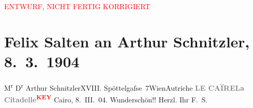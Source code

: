 
\begin{center}
            \textcolor{red}{ENTWURF, NICHT FERTIG KORRIGIERT}
                      \end{center}
            
         \renewcommand{\erwaehnteOrte}{Orte: Edmund-Weiß-Gasse, Kairo, Wien, XVIII., Währing, Österreich}
         \renewcommand{\erwaehnteWerke}{}
               \section[Felix Salten an Arthur Schnitzler, 8. 3. 1904]{ Felix Salten an Arthur Schnitzler, 8. 3. 1904}\nopagebreak{}\rehead{ }\begin{ledgroupsized}[t]{13cm}\normalsize\beginnumbering \toendnotes[C]{\smallbreak\pagebreak[2]} 
\pstart{}{\pb}M\textsuperscript{r} D\textsuperscript{r} Arthur
                  Schnitzler\pend{}\pstart{}XVIII. Spöttelgaſse 7\pend{}\pstart{}Wien\pend{}\pstart{}Autriche\pend{}{\bigskip}\pstart
           \noindent{}{\pb}\textcolor{gray}{\textbf{LE CAÏRE}}\hfill \textcolor{gray}{\textbf{La Citadelle\textcolor{red}{\textsuperscript{\textbf{KEY}}}}}\pend
           \pstart
           Cairo, 8. III. 04.\pend
           \pstart
           Wunderschön!!\pend
           \pstart Herzl. Ihr \spacefill\mbox{F. S.}\pend{}
         
         \endnumbering{}\end{ledgroupsized}\begin{anhang}\end{anhang}\newcommand{\dateiname}{L03393}\newcommand{\titel}{Felix Salten an Arthur Schnitzler, 8. 3. 1904}\newcommand{\editorInnen}{Martin Anton Müller und Laura Untner}
      